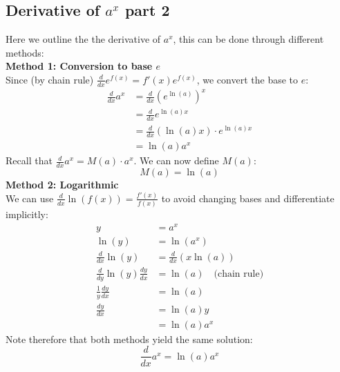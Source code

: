 \documentclass{report}
\begin{document}
\subsection{Derivative of $a^x$ part 2} %
Here we outline the the derivative of $a^x$, this can be done through different methods:\\
\textbf{Method 1: Conversion to base $e$}\\
Since (by chain rule) $\frac{d}{dx}e^{f(x)}=f'(x)e^{f(x)}$, we convert the base to $e$:
\begin{align*}
\frac{d}{dx}a^x&=\frac{d}{dx}(e^{\ln(a)})^x\\
&=\frac{d}{dx}e^{\ln(a)x}\\
&=\frac{d}{dx}(\ln(a)x)\cdot e^{\ln(a)x}\\
&=\ln(a)a^x
\end{align*}
Recall that $\frac{d}{dx}a^x=M(a)\cdot a^x$. We can now define $M(a)$:  
\begin{equation*}
M(a)=\ln(a)
\end{equation*}
\textbf{Method 2: Logarithmic}\\
We can use $\frac{d}{dx}\ln(f(x))=\frac{f'(x)}{f(x)}$ to avoid changing bases and differentiate implicitly:
\begin{align*}
y&=a^x\\
\ln(y)&=\ln(a^x)\\
\frac{d}{dx}\ln(y)&=\frac{d}{dx}(x\ln(a))\\
\frac{d}{dy}\ln(y)\frac{dy}{dx}&=\ln(a)\quad\text{(chain rule)}\\
\frac{1}{y}\frac{dy}{dx}&=\ln(a)\\
\frac{dy}{dx}&=\ln(a)y\\
&=\ln(a)a^x
\end{align*}
Note therefore that both methods yield the same solution:
\begin{equation*}
\frac{d}{dx}a^x=\ln(a)a^x
\end{equation*}
\newpage
\end{document}
